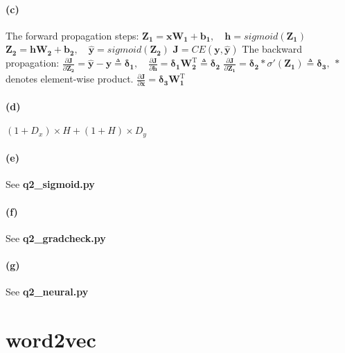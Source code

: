 \documentclass{article}
\begin{document}
\begin{spacing}{1.5}
\paragraph{(c)}
The forward propagation steps: \newline
$ \boldsymbol{Z_{1}}=\boldsymbol{xW_{1}}+\boldsymbol{b_{1}}, \quad
\boldsymbol{h}=sigmoid(\boldsymbol{Z_{1}})$ \newline
$ \boldsymbol{Z_{2}}=\boldsymbol{hW_{2}}+\boldsymbol{b_{2}}, \quad
\boldsymbol{\widehat{y}}=sigmoid(\boldsymbol{Z_{2}})$ \newline
$ \boldsymbol{J}=CE(\boldsymbol{y}, \boldsymbol{\widehat{y}}) $ \newline
The backward propagation: \newline
$ \frac{\partial \boldsymbol{J}}{\partial \boldsymbol{Z_2}}
=\boldsymbol{\widehat{y}}-\boldsymbol{y} \triangleq \boldsymbol{\delta_1}, \quad  
\frac{\partial \boldsymbol{J}}{\partial \boldsymbol{h}}
=\boldsymbol{\delta_1} \boldsymbol{W_2 ^ \mathrm{T}} \triangleq \boldsymbol{\delta_2}$ \newline
$ \frac{\partial \boldsymbol{J}}{\partial \boldsymbol{Z_1}}
=\boldsymbol{\delta_2} \ast \sigma'(\boldsymbol{Z_1})\triangleq \boldsymbol{\delta_3}, \ \ast$ denotes element-wise product. \newline
$ \frac{\partial \boldsymbol{J}}{\partial \boldsymbol{x}}
=\boldsymbol{\delta_3}\boldsymbol{W_1 ^ \mathrm{T}} $
\paragraph{(d)}
$ (1+D_x) \times H + (1+H) \times D_y $
\paragraph{(e)} See \textbf{q2\_sigmoid.py}
\paragraph{(f)} See \textbf{q2\_gradcheck.py}
\paragraph{(g)} See \textbf{q2\_neural.py}

\section{word2vec}

\end{spacing}
\end{document}
